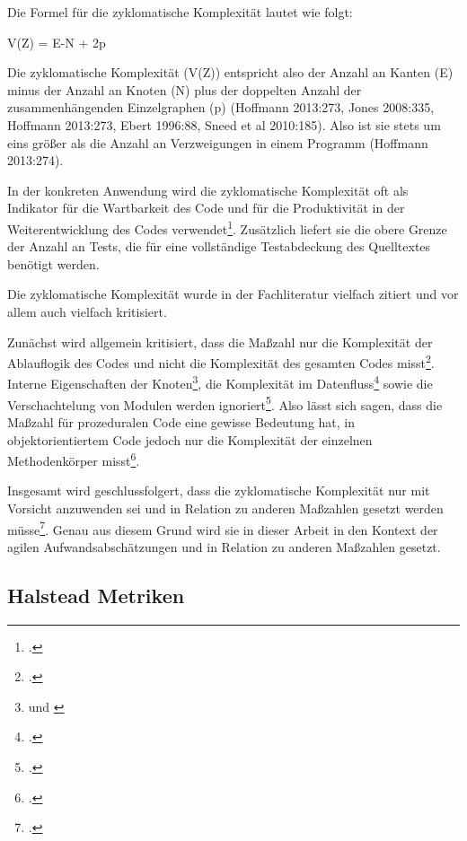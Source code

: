 Die Formel für die zyklomatische Komplexität lautet wie folgt:

V(Z) = \textbar E\textbar-\textbar N\textbar{} + 2p

Die zyklomatische Komplexität (V(Z)) entspricht also der Anzahl an
Kanten (E) minus der Anzahl an Knoten (N) plus der doppelten Anzahl der
zusammenhängenden Einzelgraphen (p) (Hoffmann 2013:273, Jones 2008:335,
Hoffmann 2013:273, Ebert 1996:88, Sneed et al 2010:185). Also ist sie
stets um eins größer als die Anzahl an Verzweigungen in einem Programm
(Hoffmann 2013:274).

In der konkreten Anwendung wird die zyklomatische Komplexität oft als
Indikator für die Wartbarkeit des Code und für die Produktivität in der
Weiterentwicklung des Codes verwendet\footcite[Vgl. ][S. 336]{jonesAppliedSoftwareMeasurement2008}.
Zusätzlich liefert sie die obere Grenze der Anzahl an Tests, die für
eine vollständige Testabdeckung des Quelltextes benötigt werden.

Die zyklomatische Komplexität wurde in der Fachliteratur vielfach
zitiert und vor allem auch vielfach kritisiert.

Zunächst wird allgemein kritisiert, dass die Maßzahl nur die Komplexität
der Ablauflogik des Codes und nicht die Komplexität des gesamten Codes
misst\footcite[Vgl. ][S. 186]{sneedSoftwareZahlenVermessung2010}. Interne Eigenschaften der Knoten\footnote{\cite[Vgl. ][S. 73]{hoffmannSoftwareQualitat2013} und \cite[S. 2]{rumreichExaminingSoftwareDesign2019}}, die Komplexität im Datenfluss\footcite[Vgl. ][S. 2]{rumreichExaminingSoftwareDesign2019} sowie die Verschachtelung von Modulen werden
ignoriert\footcite[Vgl. ][S. 89ff]{zuseSoftwareComplexityMeasures1991}. Also lässt sich sagen, dass die
Maßzahl für prozeduralen Code eine gewisse Bedeutung hat, in
objektorientiertem Code jedoch nur die Komplexität der einzelnen
Methodenkörper misst\footcite[Vgl. ][S. 186]{sneedSoftwareZahlenVermessung2010}.

Insgesamt wird geschlussfolgert, dass die zyklomatische Komplexität nur
mit Vorsicht anzuwenden sei und in Relation zu anderen Maßzahlen gesetzt
werden müsse\footcite[Vgl. ][S. 52]{fentonSoftwareMetricsRigorous2003}. Genau
aus diesem Grund wird sie in dieser Arbeit in den Kontext der agilen
Aufwandsabschätzungen und in Relation zu anderen Maßzahlen gesetzt.

\subsection{Halstead Metriken}\label{Halstead-Metriken}

